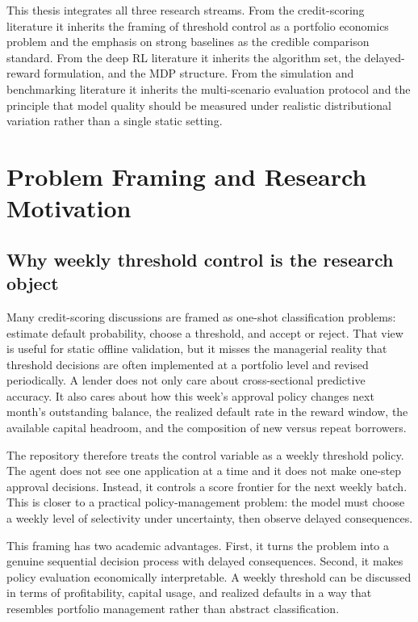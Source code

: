 \documentclass[12pt,a4paper]{article}
\begin{document}
This thesis integrates all three research streams. From the credit-scoring literature it inherits the framing of threshold control as a portfolio economics problem and the emphasis on strong baselines as the credible comparison standard. From the deep RL literature it inherits the algorithm set, the delayed-reward formulation, and the MDP structure. From the simulation and benchmarking literature it inherits the multi-scenario evaluation protocol and the principle that model quality should be measured under realistic distributional variation rather than a single static setting.

\section{Problem Framing and Research Motivation}

\subsection{Why weekly threshold control is the research object}

Many credit-scoring discussions are framed as one-shot classification problems: estimate default probability, choose a threshold, and accept or reject. That view is useful for static offline validation, but it misses the managerial reality that threshold decisions are often implemented at a portfolio level and revised periodically. A lender does not only care about cross-sectional predictive accuracy. It also cares about how this week's approval policy changes next month's outstanding balance, the realized default rate in the reward window, the available capital headroom, and the composition of new versus repeat borrowers.

The repository therefore treats the control variable as a weekly threshold policy. The agent does not see one application at a time and it does not make one-step approval decisions. Instead, it controls a score frontier for the next weekly batch. This is closer to a practical policy-management problem: the model must choose a weekly level of selectivity under uncertainty, then observe delayed consequences.

This framing has two academic advantages. First, it turns the problem into a genuine sequential decision process with delayed consequences. Second, it makes policy evaluation economically interpretable. A weekly threshold can be discussed in terms of profitability, capital usage, and realized defaults in a way that resembles portfolio management rather than abstract classification.
\end{document}
